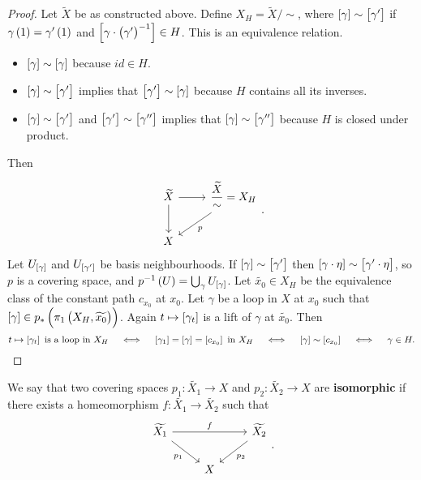 \begin{proof}
Let $ \widetilde{X} $ be as constructed above. Define $ X_H = \widetilde{X} / \sim $, where $ \sbr{\gamma} \sim \sbr{\gamma'} $ if $ \gamma\br{1} = \gamma'\br{1} $ and $ \sbr{\gamma \cdot \br{\gamma'}^{-1}} \in H $. This is an equivalence relation.
\begin{itemize}
\item $ \sbr{\gamma} \sim \sbr{\gamma} $ because $ id \in H $.
\item $ \sbr{\gamma} \sim \sbr{\gamma'} $ implies that $ \sbr{\gamma'} \sim \sbr{\gamma} $ because $ H $ contains all its inverses.
\item $ \sbr{\gamma} \sim \sbr{\gamma'} $ and $ \sbr{\gamma'} \sim \sbr{\gamma''} $ implies that $ \sbr{\gamma} \sim \sbr{\gamma''} $ because $ H $ is closed under product.
\end{itemize}
Then
$$
\begin{tikzcd}
\widetilde{X} \arrow{r} \arrow{d} & \dfrac{\widetilde{X}}{\sim} = X_H \arrow{dl}{p} \\
X &
\end{tikzcd}.
$$
Let $ U_{\sbr{\gamma}} $ and $ U_{\sbr{\gamma'}} $ be basis neighbourhoods. If $ \sbr{\gamma} \sim \sbr{\gamma'} $ then $ \sbr{\gamma \cdot \eta} \sim \sbr{\gamma' \cdot \eta} $, so $ p $ is a covering space, and $ p^{-1}\br{U} = \bigcup_\gamma U_{\sbr{\gamma}} $. Let $ \widetilde{x_0} \in X_H $ be the equivalence class of the constant path $ c_{x_0} $ at $ x_0 $. Let $ \gamma $ be a loop in $ X $ at $ x_0 $ such that $ \sbr{\gamma} \in p_*\br{\pi_1\br{X_H, \widetilde{x_0}}} $. Again $ t \mapsto \sbr{\gamma_t} $ is a lift of $ \gamma $ at $ \widetilde{x_0} $. Then
$$ t \mapsto \sbr{\gamma_t} \ \text{is a loop in} \ X_H \quad \iff \quad \sbr{\gamma_1} = \sbr{\gamma} = \sbr{c_{x_0}} \ \text{in} \ X_H \quad \iff \quad \sbr{\gamma} \sim \sbr{c_{x_0}} \quad \iff \quad \gamma \in H. $$
\end{proof}

\pagebreak

\begin{definition*}
We say that two covering spaces $ p_1 : \widetilde{X_1} \to X $ and $ p_2 : \widetilde{X_2} \to X $ are \textbf{isomorphic} if there exists a homeomorphism $ f : \widetilde{X_1} \to \widetilde{X_2} $ such that
$$
\begin{tikzcd}
\widetilde{X_1} \arrow{rr}{f} \arrow[swap]{dr}{p_1} & & \widetilde{X_2} \arrow{dl}{p_2} \\
& X &
\end{tikzcd}.
$$
\end{definition*}

